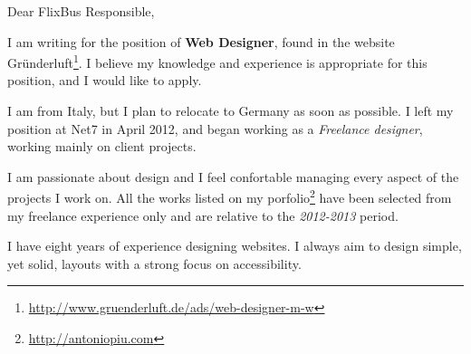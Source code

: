 \documentclass[11pt]{letter} %
\begin{document}

\begin{letter}{} 


\signature{Antonio Piu} %

\makeatletter
\renewcommand{\closing}[1]{\par\nobreak\vspace{\parskip}%
  \stopbreaks
  \noindent
  \ifx\@empty\fromaddress\else
  \hspace*{\longindentation}\fi
  \parbox{\indentedwidth}{\raggedright
       \ignorespaces #1\\[0\medskipamount]%
       \ifx\@empty\fromsig
           \fromname
       \else \fromsig \fi\strut}%
   \par}
\makeatother


\opening{Dear FlixBus Responsible,\\}

I am writing for the position of \textbf{Web Designer},
found in the website Gründerluft\footnote{\url{http://www.gruenderluft.de/ads/web-designer-m-w}}.
I believe my knowledge and experience is appropriate for this position, and I would like to apply.

I am from Italy, but I plan to relocate to Germany as soon as possible.
I left my position at Net7 in April 2012, and began working as a \emph{Freelance designer}, working mainly on client projects.

I am passionate about design and I feel confortable managing every aspect of the projects I work on. 
All the works listed on my porfolio\footnote{\url{http://antoniopiu.com}} have been selected from my freelance experience only and are relative to the \emph{2012-2013} period.

I have eight years of experience designing websites. I always aim to design simple, yet solid, layouts with a strong focus on accessibility.


\end{letter}
\end{document}
